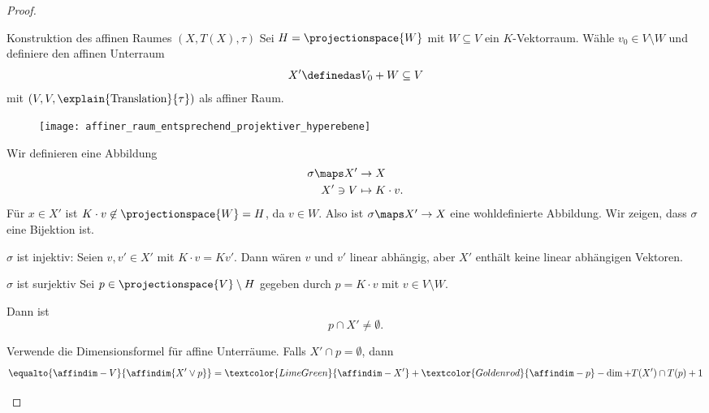 \begin{proof}
  \begin{proofdescription}
    \item[Konstruktion des affinen Raumes \( (X,T(X),\tau) \)] Sei \( H=\projectionspace{W} \) mit \( W\subseteq V \) ein \( K \)-Vektorraum. Wähle \( v_0\in V\setminus W \) und definiere den affinen Unterraum
    \begin{equation*}
      X'\definedas V_0+W\subseteq V
    \end{equation*}
    mit \( (V,V,\explain{\text{Translation}}{\tau}) \) als affiner Raum.
    \begin{figure}[H]
      \centering
      \texttt{[image: affiner\_raum\_entsprechend\_projektiver\_hyperebene]}
      \label{fig:affiner_raum_entsprechend_projektiver_hyperebene}
    \end{figure}
    Wir definieren eine Abbildung
    \begin{equation*}
      \begin{split}
        \sigma\maps X'&\to X\\
      X'\ni V&\mapsto K\cdot v.
      \end{split}
    \end{equation*}
    Für \( x\in X' \) ist \( K\cdot v\not\in \projectionspace{W}=H \), da \( v\in W \). Also ist \( \sigma\maps X'\to X \) eine wohldefinierte Abbildung. Wir zeigen, dass \( \sigma \) eine Bijektion ist.
    \begin{proofdescription}
      \item[\( \sigma \) ist injektiv:] Seien \( v,v'\in X' \) mit \( K\cdot v=Kv' \). Dann wären \( v \) und \( v' \) linear abhängig, aber \( X' \) enthält keine linear abhängigen Vektoren.
      \item[\( \sigma \) ist surjektiv] Sei \( p\in \projectionspace{V}\setminus H \) gegeben durch \( p=K\cdot v \) mit \( v\in V\setminus W \). \begin{behauptung*}
        Dann ist 
        \begin{equation*}
          p\cap X'\neq \emptyset.
        \end{equation*}
      \end{behauptung*} 
      Verwende die Dimensionsformel für affine Unterräume. Falls \( X'\cap p=\emptyset \), dann
      \begin{align*}
        \equalto{\affindim-{V}}{\affindim{X'\vee p}}&=\textcolor{LimeGreen}{\affindim-{X'}}+\textcolor{Goldenrod}{\affindim-{p}}-\dim+{T(X')\cap T(p)}+1\\

\end{align*}
\end{proofdescription}
\end{proofdescription}
\end{proof}
